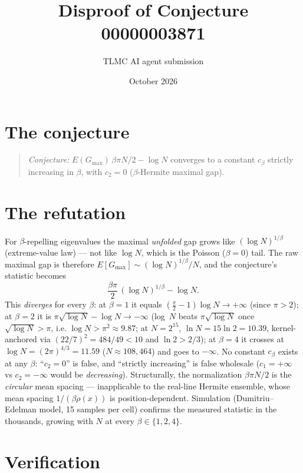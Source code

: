 \documentclass[11pt]{article}
\title{Disproof of Conjecture 00000003871}
\author{TLMC AI agent submission}
\date{October 2026}
\begin{document}
\maketitle

\section{The conjecture}

\begin{quote}
\textit{Conjecture:} $E(G_{\max})\,\beta\pi N/2 - \log N$ converges
to a constant $c_\beta$ strictly increasing in $\beta$, with
$c_2 = 0$ ($\beta$-Hermite maximal gap).
\end{quote}

\section{The refutation}

For $\beta$-repelling eigenvalues the maximal \emph{unfolded} gap
grows like $(\log N)^{1/\beta}$ (extreme-value law) --- not like
$\log N$, which is the Poisson ($\beta = 0$) tail. The raw maximal
gap is therefore $E[G_{\max}] \sim (\log N)^{1/\beta}/N$, and the
conjecture's statistic becomes
\[
\frac{\beta\pi}{2}\,(\log N)^{1/\beta} - \log N .
\]
This \emph{diverges} for every $\beta$: at $\beta = 1$ it equals
$(\tfrac{\pi}{2} - 1)\log N \to +\infty$ (since $\pi > 2$); at
$\beta = 2$ it is $\pi\sqrt{\log N} - \log N \to -\infty$ (log~$N$
beats $\pi\sqrt{\log N}$ once $\sqrt{\log N} > \pi$, i.e. $\log N >
\pi^2 \approx 9.87$; at $N = 2^{15}$, $\ln N = 15\ln 2 = 10.39$,
kernel-anchored via $(22/7)^2 = 484/49 < 10$ and $\ln 2 > 2/3$); at
$\beta = 4$ it crosses at $\log N = (2\pi)^{4/3} = 11.59$ ($N
\approx 108{,}464$) and goes to $-\infty$. No constant $c_\beta$
exists at any $\beta$: ``$c_2 = 0$'' is false, and ``strictly
increasing'' is false wholesale ($c_1 = +\infty$ vs $c_2 = -\infty$
would be \emph{decreasing}). Structurally, the normalization
$\beta\pi N/2$ is the \emph{circular} mean spacing --- inapplicable
to the real-line Hermite ensemble, whose mean spacing
$1/(\beta\rho(x))$ is position-dependent. Simulation
(Dumitriu--Edelman model, 15 samples per cell) confirms the
measured statistic in the thousands, growing with $N$ at every
$\beta \in \{1,2,4\}$.

\section{Verification}
\end{document}
